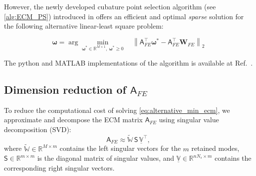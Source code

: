 \documentclass[11pt]{article}
\renewcommand{\vec}[1]{\mathbf{#1}}
\newcommand{\mat}[1]{\mathsf{#1}}
\begin{document}
However, the newly developed cubature point selection algorithm (see \cref{alg:ECM_PS}) introduced in \cite{bravo2024subspace} offers an efficient and optimal \textit{sparse} solution for the following alternative linear-least square problem:

\begin{equation}
\boldsymbol{\omega} = \arg \min_{\boldsymbol{\omega^*} \in \mathbb{R}^{M\times 1},\ \boldsymbol{\omega^*} \geq 0} \quad \left\| \mat{A}_{FE}^\top \boldsymbol{\omega^*} - \mat{A}_{FE}^\top \vec{W}_{FE} \right\|_2 
\label{eq:alternative_min_ecm}
\end{equation}




The python and MATLAB implementations of the algorithm is available at  Ref.~\cite{ecm_python_GitHub}.


\subsection*{Dimension reduction of $\mat{A}_{FE}$}

To reduce the computational cost of solving \cref{eq:alternative_min_ecm}, we approximate and decompose the ECM matrix \(\mat{A}_{FE}\) using singular value decomposition (SVD):
\begin{equation}
\mat{A}_{FE} \approx \widetilde{\mathbb{W}}\, \mat{S}\, \underline{\mathbb{V}}^{\top},
\end{equation}
where \(\widetilde{\mathbb{W}} \in \mathbb{R}^{M \times m}\) contains the left singular vectors for the \(m\) retained modes, \(\mat{S} \in \mathbb{R}^{m \times m}\) is the diagonal matrix of singular values, and \(\underline{\mathbb{V}} \in \mathbb{R}^{nN_s \times m}\) contains the corresponding right singular vectors.
\end{document}
